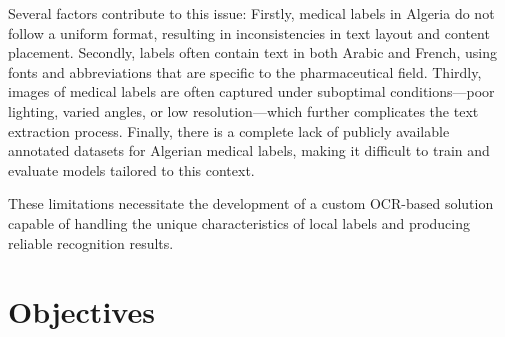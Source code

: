 Several factors contribute to this issue: Firstly, medical labels in Algeria do not follow a uniform format, resulting in inconsistencies in text layout and content placement. Secondly, labels often contain text in both Arabic and French, using fonts and abbreviations that are specific to the pharmaceutical field. Thirdly, images of medical labels are often captured under suboptimal conditions—poor lighting, varied angles, or low resolution—which further complicates the text extraction process. Finally, there is a complete lack of publicly available annotated datasets for Algerian medical labels, making it difficult to train and evaluate models tailored to this context.

These limitations necessitate the development of a custom OCR-based solution capable of handling the unique characteristics of local labels and producing reliable recognition results.

\section*{Objectives}

